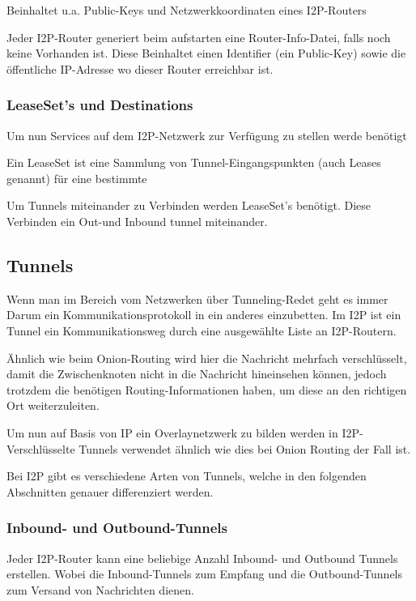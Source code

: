 Beinhaltet u.a. Public-Keys und
Netzwerkkoordinaten eines I2P-Routers

Jeder I2P-Router generiert beim aufstarten eine Router-Info-Datei, falls noch keine Vorhanden ist.
Diese Beinhaltet einen Identifier (ein Public-Key) sowie die öffentliche IP-Adresse wo dieser Router erreichbar ist.

\subsubsection{LeaseSet's und Destinations}

Um nun Services auf dem I2P-Netzwerk zur Verfügung zu stellen werde benötigt 

Ein LeaseSet ist eine Sammlung von Tunnel-Eingangspunkten (auch Leases genannt) für eine bestimmte 


Um Tunnels miteinander zu Verbinden werden LeaseSet's benötigt. Diese Verbinden ein Out-und Inbound tunnel miteinander. \cite{noauthor_intro_nodate}

\subsection{Tunnels}

Wenn man im Bereich vom Netzwerken über Tunneling-Redet geht es immer Darum ein Kommunikationsprotokoll in ein anderes einzubetten. \cite{noauthor_duden_nodate}
Im I2P ist ein Tunnel ein Kommunikationsweg durch eine ausgewählte Liste an I2P-Routern.

Ähnlich wie beim Onion-Routing wird hier die Nachricht mehrfach verschlüsselt, damit die Zwischenknoten nicht in die Nachricht hineinsehen können, jedoch trotzdem die benötigen Routing-Informationen haben, um diese an den richtigen Ort weiterzuleiten.

\cite{noauthor_intro_nodate}

Um nun auf Basis von IP ein Overlaynetzwerk zu bilden werden in I2P-Verschlüsselte Tunnels verwendet ähnlich wie dies bei Onion Routing der Fall ist.

Bei I2P gibt es verschiedene Arten von Tunnels, welche in den folgenden Abschnitten genauer differenziert werden.


\subsubsection{Inbound- und Outbound-Tunnels}
Jeder I2P-Router kann eine beliebige Anzahl Inbound- und Outbound Tunnels erstellen.
Wobei die Inbound-Tunnels zum Empfang und die Outbound-Tunnels zum Versand von Nachrichten dienen.
\cite{noauthor_intro_nodate}

